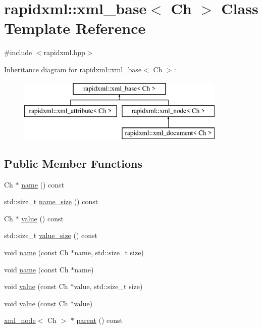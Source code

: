 \hypertarget{classrapidxml_1_1xml__base}{}\section{rapidxml\+:\+:xml\+\_\+base$<$ Ch $>$ Class Template Reference}
\label{classrapidxml_1_1xml__base}


{\ttfamily \#include $<$rapidxml.\+hpp$>$}

Inheritance diagram for rapidxml\+:\+:xml\+\_\+base$<$ Ch $>$\+:\begin{figure}[H]
\begin{center}
\leavevmode
\includegraphics[height=3.000000cm]{classrapidxml_1_1xml__base}
\end{center}
\end{figure}
\subsection*{Public Member Functions}
\begin{DoxyCompactItemize}
\item 
Ch $\ast$ \mbox{\hyperlink{classrapidxml_1_1xml__base_aef8ae147fbee59209f714274afc80dc4}{name}} () const
\item 
std\+::size\+\_\+t \mbox{\hyperlink{classrapidxml_1_1xml__base_a20c8ffbe0c7a0b4231681ab8b99330a4}{name\+\_\+size}} () const
\item 
Ch $\ast$ \mbox{\hyperlink{classrapidxml_1_1xml__base_a6af65de5e59ac497cd69838f8a89d602}{value}} () const
\item 
std\+::size\+\_\+t \mbox{\hyperlink{classrapidxml_1_1xml__base_a2eb123d471b1567fa4832b6ee2b75493}{value\+\_\+size}} () const
\item 
void \mbox{\hyperlink{classrapidxml_1_1xml__base_ae55060ae958c6e6465d6c8db852ec6ce}{name}} (const Ch $\ast$name, std\+::size\+\_\+t size)
\item 
void \mbox{\hyperlink{classrapidxml_1_1xml__base_a4611ddc82ac83a527c65606600eb2a0d}{name}} (const Ch $\ast$name)
\item 
void \mbox{\hyperlink{classrapidxml_1_1xml__base_a3b183c2db7022a6d30494dd2f0ac11e9}{value}} (const Ch $\ast$value, std\+::size\+\_\+t size)
\item 
void \mbox{\hyperlink{classrapidxml_1_1xml__base_a81e63ec4bfd2d7ef0a6c2ed49be6e623}{value}} (const Ch $\ast$value)
\item 
\mbox{\hyperlink{classrapidxml_1_1xml__node}{xml\+\_\+node}}$<$ Ch $>$ $\ast$ \mbox{\hyperlink{classrapidxml_1_1xml__base_aa807062868d671a8c798d9d1bf016988}{parent}} () const
\end{DoxyCompactItemize}
